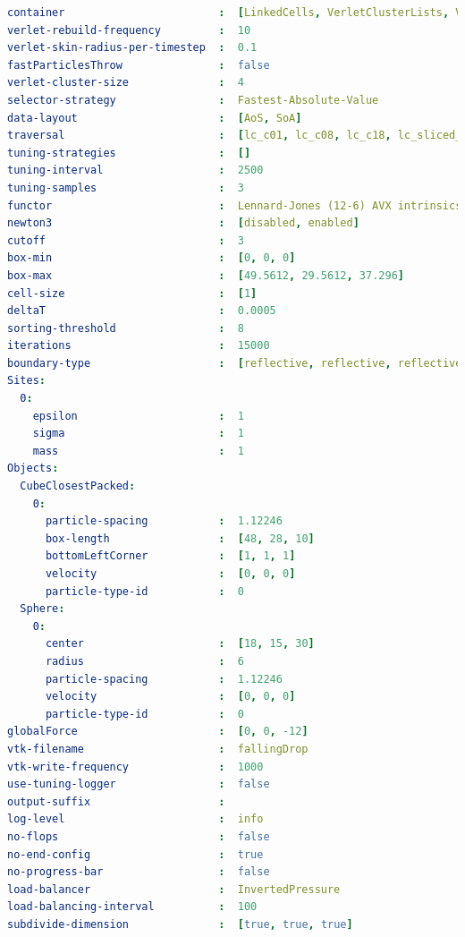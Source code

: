 \begin{lstlisting}[language=yaml,basicstyle=\tiny,  breaklines=true, caption={fallingDrop.yaml}, label={lst:fallingDrop}]
container                        :  [LinkedCells, VerletClusterLists, VerletLists, VerletListsCells]
verlet-rebuild-frequency         :  10
verlet-skin-radius-per-timestep  :  0.1
fastParticlesThrow               :  false
verlet-cluster-size              :  4
selector-strategy                :  Fastest-Absolute-Value
data-layout                      :  [AoS, SoA]
traversal                        :  [lc_c01, lc_c08, lc_c18, lc_sliced_c02, vcl_c01_balanced, vcl_c06, vcl_cluster_iteration, vl_list_iteration, vlc_c01, vlc_c18, vlc_sliced_c02]
tuning-strategies                :  []
tuning-interval                  :  2500
tuning-samples                   :  3
functor                          :  Lennard-Jones (12-6) AVX intrinsics
newton3                          :  [disabled, enabled]
cutoff                           :  3
box-min                          :  [0, 0, 0]
box-max                          :  [49.5612, 29.5612, 37.296]
cell-size                        :  [1]
deltaT                           :  0.0005
sorting-threshold                :  8
iterations                       :  15000
boundary-type                    :  [reflective, reflective, reflective]
Sites:                           
  0:
    epsilon                      :  1
    sigma                        :  1
    mass                         :  1
Objects:                         
  CubeClosestPacked:
    0:  
      particle-spacing           :  1.12246
      box-length                 :  [48, 28, 10]
      bottomLeftCorner           :  [1, 1, 1]
      velocity                   :  [0, 0, 0]
      particle-type-id           :  0
  Sphere:
    0:  
      center                     :  [18, 15, 30]
      radius                     :  6
      particle-spacing           :  1.12246
      velocity                   :  [0, 0, 0]
      particle-type-id           :  0
globalForce                      :  [0, 0, -12]
vtk-filename                     :  fallingDrop
vtk-write-frequency              :  1000
use-tuning-logger                :  false
output-suffix                    :  
log-level                        :  info
no-flops                         :  false
no-end-config                    :  true
no-progress-bar                  :  false
load-balancer                    :  InvertedPressure
load-balancing-interval          :  100
subdivide-dimension              :  [true, true, true]
\end{lstlisting}


